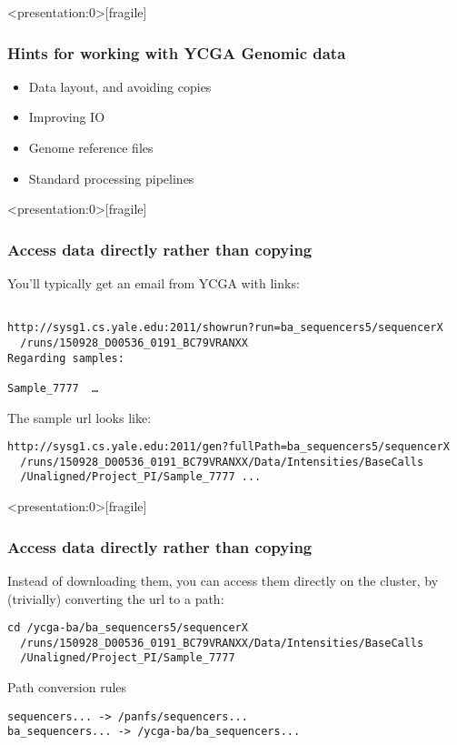 \documentclass[10pt]{beamer}
\begin{document}
\begin{frame}<presentation:0>[fragile]
\frametitle{Hints for working with YCGA Genomic data}
\begin{itemize}
\item Data layout, and avoiding copies
\item Improving IO
\item Genome reference files
\item Standard processing pipelines
\end{itemize}
\end{frame}

\begin{frame}<presentation:0>[fragile]
\frametitle{Access data directly rather than copying}

You'll typically get an email from YCGA with links:

\begin{verbatim}

http://sysg1.cs.yale.edu:2011/showrun?run=ba_sequencers5/sequencerX 
  /runs/150928_D00536_0191_BC79VRANXX 
Regarding samples:

Sample_7777  …
\end{verbatim}

The sample url looks like:

\begin{verbatim}
http://sysg1.cs.yale.edu:2011/gen?fullPath=ba_sequencers5/sequencerX
  /runs/150928_D00536_0191_BC79VRANXX/Data/Intensities/BaseCalls
  /Unaligned/Project_PI/Sample_7777 ...

\end{verbatim}
\end{frame}


\begin{frame}<presentation:0>[fragile]
\frametitle{Access data directly rather than copying}

Instead of downloading them, you can access them directly on the cluster, by (trivially) 
converting the url to a path:

\begin{verbatim}
cd /ycga-ba/ba_sequencers5/sequencerX
  /runs/150928_D00536_0191_BC79VRANXX/Data/Intensities/BaseCalls
  /Unaligned/Project_PI/Sample_7777
\end{verbatim}

Path conversion rules
\begin{verbatim}
sequencers... -> /panfs/sequencers...
ba_sequencers... -> /ycga-ba/ba_sequencers...
\end{verbatim}

\end{frame}
\end{document}
